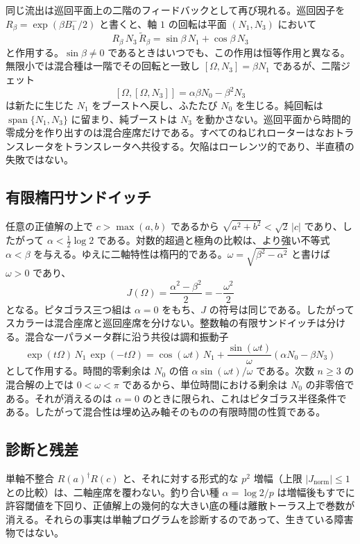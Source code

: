\documentclass[a4paper]{article}
\theoremstyle{definition}
\theoremstyle{remark}
\newcommand{\Jnorm}{J_{\mathrm{norm}}}
\begin{document}
同じ流出は巡回平面上の二階のフィードバックとして再び現れる。巡回因子を \(R_\beta=\exp(\beta B^-_1/2)\) と書くと、軸 \(1\) の回転は平面 \((N_1,N_3)\) において
\[
R_\beta\,N_3\,\widetilde{R}_\beta=\sin\beta\,N_1+\cos\beta\,N_3
\]
と作用する。\(\sin\beta\neq 0\) であるときはいつでも、この作用は恒等作用と異なる。無限小では混合種は一階でその回転と一致し \([\Omega,N_3]=\beta N_1\) であるが、二階ジェット
\[
[\Omega,[\Omega,N_3]]=\alpha\beta N_0-\beta^2 N_3
\]
は新たに生じた \(N_1\) をブーストへ戻し、ふたたび \(N_0\) を生じる。純回転は \(\operatorname{span}\{N_1,N_3\}\) に留まり、純ブーストは \(N_3\) を動かさない。巡回平面から時間的零成分を作り出すのは混合座席だけである。すべてのねじれローターはなおトランスレータをトランスレータへ共役する。欠陥はローレンツ的であり、半直積の失敗ではない。

\subsection{有限楕円サンドイッチ}

任意の正値解の上で \(c>\max(a,b)\) であるから \(\sqrt{a^2+b^2}<\sqrt{2}\,|c|\) であり、したがって \(\alpha<\frac12\log 2\) である。対数的超過と極角の比較は、より強い不等式 \(\alpha<\beta\) を与える。ゆえに二軸特性は楕円的である。\(\omega=\sqrt{\beta^2-\alpha^2}\) と書けば \(\omega>0\) であり、
\[
J(\Omega)=\frac{\alpha^2-\beta^2}{2}=-\frac{\omega^2}{2}
\]
となる。ピタゴラス三つ組は \(\alpha=0\) をもち、\(J\) の符号は同じである。したがってスカラーは混合座席と巡回座席を分けない。整数軸の有限サンドイッチは分ける。混合な一パラメータ群に沿う共役は調和振動子
\[
\exp(t\Omega)\,N_1\,\exp(-t\Omega)=\cos(\omega t)\,N_1+\frac{\sin(\omega t)}{\omega}(\alpha N_0-\beta N_3)
\]
として作用する。時間的零剰余は \(N_0\) の倍 \(\alpha\sin(\omega t)/\omega\) である。次数 \(n\ge 3\) の混合解の上では \(0<\omega<\pi\) であるから、単位時間における剰余は \(N_0\) の非零倍である。それが消えるのは \(\alpha=0\) のときに限られ、これはピタゴラス半径条件である。したがって混合性は埋め込み軸そのものの有限時間の性質である。

\subsection{診断と残差}

単軸不整合 \(R(a)^\dagger R(c)\) と、それに対する形式的な \(p^2\) 増幅（上限 \(|\Jnorm|\le 1\) との比較）は、二軸座席を覆わない。釣り合い種 \(\alpha=\log 2/p\) は増幅後もすでに許容閾値を下回り、正値解上の幾何的な大きい底の種は離散トーラス上で巻数が消える。それらの事実は単軸プログラムを診断するのであって、生きている障害物ではない。
\end{document}
